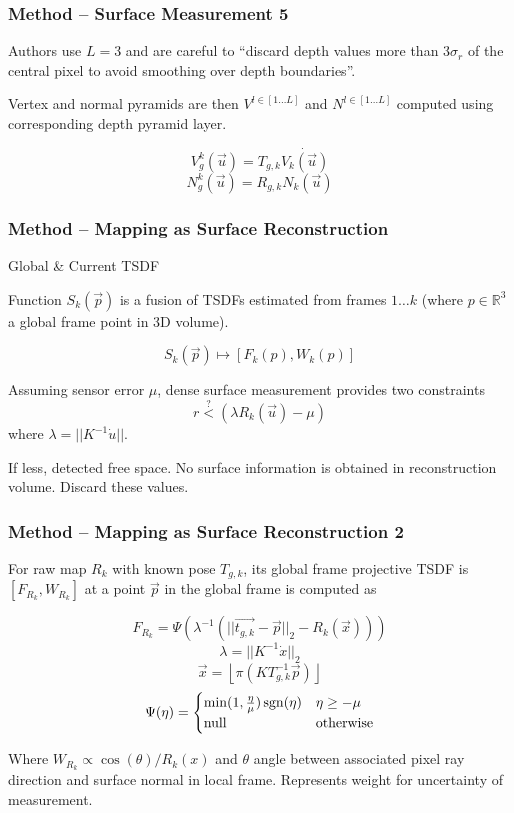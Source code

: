 \begin{frame}
\frametitle{Method -- Surface Measurement 5}

Authors use $L=3$ and are careful to ``discard depth values more than $3\sigma_r$
of the central pixel to avoid smoothing over depth boundaries''.

Vertex and normal pyramids are then $V^{l \in [1 \dots L]}$ and $N^{l \in [1 \dots L ]}$
computed using corresponding depth pyramid layer.

\[V_g^k(\vec{u}) = T_{g,k}\dot{V_k(\vec{u})} \]
\[N_g^k(\vec{u}) = R_{g,k}N_k(\vec{u}) \]
\end{frame}


\begin{frame}
\frametitle{Method -- Mapping as Surface Reconstruction}
{\Large Global \& Current TSDF}

Function $S_k(\vec{p})$ is a fusion of TSDFs estimated
 from frames $1 \dots k$ (where $p \in \mathbb{R}^3$ a global frame point in 3D volume).

\[ S_k(\vec{p}) \mapsto [F_k(p), W_k(p)] \]

Assuming sensor error $\mu$, dense surface measurement provides two constraints
\[ r \overset{?}{<} (\lambda R_k(\vec{u}) - \mu) \]
where $\lambda = || K^{-1}\dot{u}||$.

If less, detected free space. No surface information is obtained in reconstruction volume.
Discard these values.
\end{frame}

\begin{frame}
\frametitle{Method -- Mapping as Surface Reconstruction 2}

For raw map $R_k$ with known pose $T_{g,k}$, its global frame projective
TSDF is $[F_{R_k}, W_{R_k}]$ at a point $\vec{p}$ in the global frame is computed as

\[ F_{R_k} = \Psi\left( \lambda^{-1} (||\vec{t_{g,k}} - \vec{p}||_2 - R_k(\vec{x}))\right) \]
\[ \lambda = ||K^{-1}\dot{x}||_2 \]
\[ \vec{x} = \left\lfloor \pi (KT^{-1}_{g,k}\vec{p})\right\rfloor \]
\[ \Psi(\eta) = \begin{cases}
\min(1, \frac{\eta}{\mu}) \operatorname{sgn}(\eta) & \eta \geq - \mu \\
\text{null} & \text{otherwise}
\end{cases} \]

Where $W_{R_k} \propto \cos (\theta) / R_k(x)$ and $\theta$ angle between
associated pixel ray direction and surface normal in local frame.
Represents weight for uncertainty of measurement.

\end{frame}


